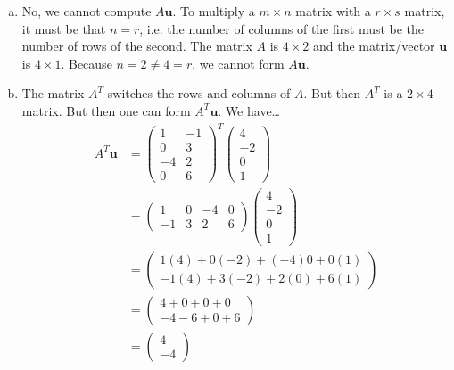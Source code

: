 \documentclass[11pt,letterpaper]{article}
\begin{document}
\sol 
\begin{enumerate}[(a)]
\item No, we cannot compute $A \mathbf{u}$. To multiply a $m \times n$ matrix with a $r \times s$ matrix, it must be that $n= r$, i.e. the number of columns of the first must be the number of rows of the second. The matrix $A$ is $4 \times 2$ and the matrix/vector $\mathbf{u}$ is $4 \times 1$. Because $n= 2 \neq 4= r$, we cannot form $A \mathbf{u}$. \pspace

\item The matrix $A^T$ switches the rows and columns of $A$. But then $A^T$ is a $2 \times 4$ matrix. But then one can form $A^T \mathbf{u}$. We have\dots
	\[
	\begin{aligned}
	A^T\mathbf{u}&= \begin{pmatrix} 1 & -1 \\ 0 & 3 \\ -4 & 2 \\ 0 & 6 \end{pmatrix}^T \begin{pmatrix} 4 \\ -2 \\ 0 \\ 1 \end{pmatrix} \\[0.3cm]
	&= \begin{pmatrix} 1 & 0 & -4 & 0 \\ -1 & 3 & 2 & 6 \end{pmatrix} \begin{pmatrix} 4 \\ -2 \\ 0 \\ 1 \end{pmatrix} \\[0.3cm]
	&= \begin{pmatrix} 1(4) + 0(-2) + (-4)0 + 0(1) \\ -1(4) + 3(-2) + 2(0) + 6(1) \end{pmatrix} \\[0.3cm]
	&= \begin{pmatrix} 4 + 0 + 0 + 0 \\ -4 - 6 + 0 + 6 \end{pmatrix} \\[0.3cm]
	&= \begin{pmatrix} 4 \\ -4 \end{pmatrix}
	\end{aligned}
	\]
\end{enumerate}
\end{document}
